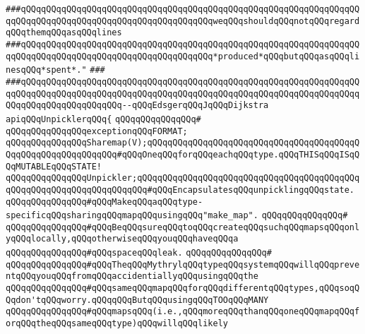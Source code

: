 \verb|###qQQqqQQqqQQqqQQqqQQqqQQqqQQqqQQqqQQqqQQqqQQqqQQqqQQqqQQqqQQqqQQqqQQqqQQqqQQqqQQqqQQqqQQqqQQqqQQqqQQqqQQqqQQqweqQQqshouldqQQqnotqQQqregardqQQqthemqQQqasqQQqlines|\newline
\verb|###qQQqqQQqqQQqqQQqqQQqqQQqqQQqqQQqqQQqqQQqqQQqqQQqqQQqqQQqqQQqqQQqqQQqqQQqqQQqqQQqqQQqqQQqqQQqqQQqqQQqqQQqqQQq*produced*qQQqbutqQQqasqQQqlinesqQQq*spent*."|\newline
\verb|###|\newline
\verb|###qQQqqQQqqQQqqQQqqQQqqQQqqQQqqQQqqQQqqQQqqQQqqQQqqQQqqQQqqQQqqQQqqQQqqQQqqQQqqQQqqQQqqQQqqQQqqQQqqQQqqQQqqQQqqQQqqQQqqQQqqQQqqQQqqQQqqQQqqQQqqQQqqQQqqQQqqQQqqQQq--qQQqEdsgerqQQqJqQQqDijkstra|\newline
\newline
\newline
\newline
\newline
\verb|apiqQQqUnpicklerqQQq{|\newline
\verb|qQQqqQQqqQQqqQQq#|\newline
\verb|qQQqqQQqqQQqqQQqexceptionqQQqFORMAT;|\newline
\newline
\verb|qQQqqQQqqQQqqQQqSharemap(V);qQQqqQQqqQQqqQQqqQQqqQQqqQQqqQQqqQQqqQQqqQQqqQQqqQQqqQQqqQQqqQQq#qQQqOneqQQqforqQQqeachqQQqtype.qQQqTHISqQQqISqQQqMUTABLEqQQqSTATE!|\newline
\verb|qQQqqQQqqQQqqQQqUnpickler;qQQqqQQqqQQqqQQqqQQqqQQqqQQqqQQqqQQqqQQqqQQqqQQqqQQqqQQqqQQqqQQqqQQqqQQq#qQQqEncapsulatesqQQqunpicklingqQQqstate.|\newline
\newline
\verb|qQQqqQQqqQQqqQQq#qQQqMakeqQQqaqQQqtype-specificqQQqsharingqQQqmapqQQqusingqQQq"make_map".|\newline
\verb|qQQqqQQqqQQqqQQq#|\newline
\verb|qQQqqQQqqQQqqQQq#qQQqBeqQQqsureqQQqtoqQQqcreateqQQqsuchqQQqmapsqQQqonlyqQQqlocally,qQQqotherwiseqQQqyouqQQqhaveqQQqa|\newline
\verb|qQQqqQQqqQQqqQQq#qQQqspaceqQQqleak.|\newline
\verb|qQQqqQQqqQQqqQQq#|\newline
\verb|qQQqqQQqqQQqqQQq#qQQqTheqQQqMythrylqQQqtypeqQQqsystemqQQqwillqQQqpreventqQQqyouqQQqfromqQQqaccidentiallyqQQqusingqQQqthe|\newline
\verb|qQQqqQQqqQQqqQQq#qQQqsameqQQqmapqQQqforqQQqdifferentqQQqtypes,qQQqsoqQQqdon'tqQQqworry.qQQqqQQqButqQQqusingqQQqTOOqQQqMANY|\newline
\verb|qQQqqQQqqQQqqQQq#qQQqmapsqQQq(i.e.,qQQqmoreqQQqthanqQQqoneqQQqmapqQQqforqQQqtheqQQqsameqQQqtype)qQQqwillqQQqlikely|\newline
